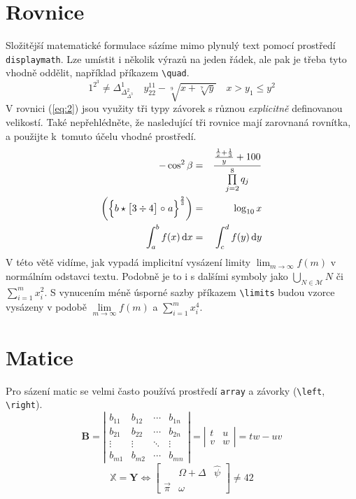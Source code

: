 \documentclass[hidelinks, twocolumn, a4paper, 11pt]{article}
\theoremstyle{definition}
\begin{document}
\section{Rovnice}
Složitější matematické formulace sázíme mimo plynulý text pomocí prostředí \verb|displaymath|. 
Lze umístit i několik výrazů na jeden řádek, ale pak je třeba tyto vhodně oddělit, 
například příkazem \verb|\quad|. 
\[ 
1^{2^3} \neq \Delta_{\Delta_{\Delta^3}^2}^1 \quad
y^{11}_{22} - \sqrt[9]{x+\sqrt[7]{y}} \quad 
x > y_1 \leq y^2    
\]
V rovnici (\ref{eq:2}) jsou využity tři typy závorek s různou \emph{explicitně} definovanou velikostí. 
Také nepřehlédněte, že nasledující tři rovnice mají zarovnaná rovnítka, 
a použijte k~tomuto účelu vhodné prostředí. 
\begin{eqnarray}
    -\cos^2\beta & = & \frac{\frac{\frac{1}{x} + \frac{1}{3}}{y}+100}{\prod\limits_{j=2}^8 q_j} \label{eq:1} \\
    \biggl( \Bigl\{ b \star \bigl[3 \div 4 \bigl]\;\circ\;a \Bigl\}^{\frac{2}{3}} \biggl) & = & \log_{10} x \label{eq:2}\\
    \int_a^b f(x)\,\mathrm{d}x & = & \int_c^d f(y)\,\mathrm{d}y \label{eq:3}
\end{eqnarray}
V této větě vidíme, jak vypadá implicitní vysázení limity $\lim_{m \to \infty} f(m)$ v normálním odstavci textu. 
Podobně je to i s dalšími symboly jako $ \bigcup_{N \in \mathcal{M}} N$ či $\sum_{i=1}^{m} x_i^2$. 
S vynucením méně úsporné sazby příkazem \verb|\limits| budou vzorce vysázeny v podobě $ \lim\limits_{m \to \infty} f(m)$ a $ \sum\limits_{i=1}^m x_i^4 $.

\section{Matice}
Pro sázení matic se velmi často používá prostředí \verb|array| a závorky (\verb|\left|, \verb|\right|). 
\[
    \mathbf{B} = 
    \left| \begin{array}{cccc}
        b_{11} & b_{12} & \cdots & b_{1n} \\
        b_{21} & b_{22} & \cdots & b_{2n} \\
        \vdots & \vdots & \ddots & \vdots \\ 
        b_{m1} & b_{m2} & \cdots & b_{mn}
    \end{array} \right|
    =
    \left| \begin{array}{cc}
        t & u \\
        v & w
    \end{array} \right|
    =
    tw - uv
\]
\[
    \mathbb{X} = \mathbf{Y} \Longleftrightarrow 
    \left[ \begin{array}{ccc}
        & \Omega + \Delta & \hat{\psi} \\
        \vec{\pi} & \omega & 
    \end{array} \right]
    \neq 42
\]
\end{document}
